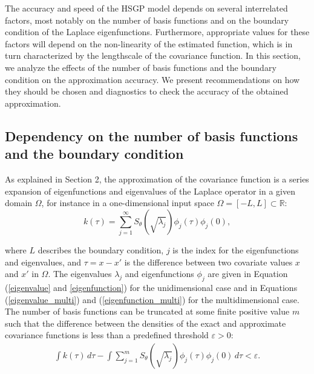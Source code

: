 \documentclass[]{interact}
\theoremstyle{plain}%
\theoremstyle{definition}
\theoremstyle{remark}
\begin{document}
The accuracy and speed of the HSGP model depends on several interrelated factors, most notably on the number of basis functions and on the boundary condition of the Laplace eigenfunctions. Furthermore, appropriate values for these factors will depend on the non-linearity of the estimated function, which is in turn characterized by the lengthscale of the covariance function.
In this section, we analyze the effects of the number of basis functions and the boundary condition on the approximation accuracy. We present recommendations on how they should be chosen and diagnostics to check the accuracy of the obtained approximation.

\subsection{Dependency on the number of basis functions and the boundary condition}

As explained in Section 2, the approximation of the covariance function is a series expansion of eigenfunctions and eigenvalues of the Laplace operator in a given domain $\Omega$, for instance in a one-dimensional input space $\Omega=[-L,L]\subset \mathbb{R}$:
%
\begin{equation}\label{diffcov}
k(\tau) = \sum_{j=1}^{\infty} S_{\theta} \left(\sqrt{\lambda_j} \right) \phi_j(\tau) \phi_j(0),  \nonumber
\end{equation} 

\noindent where $L$ describes the boundary condition, $j$ is the index for the eigenfunctions and eigenvalues, and $\tau=x-x'$ is the difference between two covariate values $x$ and $x'$ in $\Omega$. The eigenvalues $\lambda_j$ and eigenfunctions $\phi_j$ are given in Equation (\ref{eigenvalue} and \ref{eigenfunction}) for the unidimensional case and in Equations (\ref{eigenvalue_multi}) and (\ref{eigenfunction_multi}) for the multidimensional case. The number of basis functions can be truncated at some finite positive value $m$ such that the difference between the densities of the exact and approximate covariance functions is less than a predefined threshold $\varepsilon > 0$:
%
\begin{eqnarray}\label{diff_covs}
\int k(\tau) \, d\tau - 
\int \sum_{j=1}^m S_{\theta}\left(\sqrt{\lambda_j} \right) \phi_j(\tau) \phi_j(0) \, d\tau < \varepsilon.
\end{eqnarray}
\end{document}
